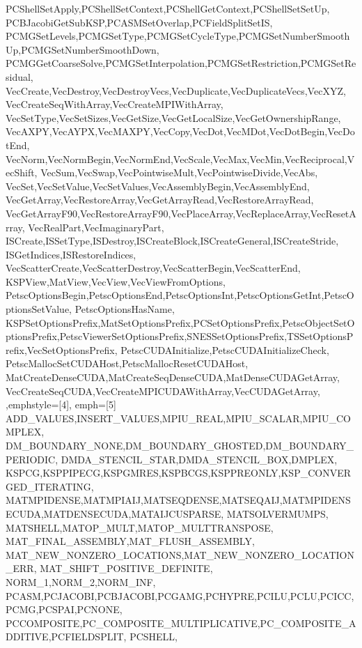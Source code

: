 {{{{{    PCShellSetApply,PCShellSetContext,PCShellGetContext,PCShellSetSetUp,
    PCBJacobiGetSubKSP,PCASMSetOverlap,PCFieldSplitSetIS,
    PCMGSetLevels,PCMGSetType,PCMGSetCycleType,PCMGSetNumberSmoothUp,PCMGSetNumberSmoothDown,
    PCMGGetCoarseSolve,PCMGSetInterpolation,PCMGSetRestriction,PCMGSetResidual,
    VecCreate,VecDestroy,VecDestroyVecs,VecDuplicate,VecDuplicateVecs,VecXYZ,
    VecCreateSeqWithArray,VecCreateMPIWithArray,
    VecSetType,VecSetSizes,VecGetSize,VecGetLocalSize,VecGetOwnershipRange,
    VecAXPY,VecAYPX,VecMAXPY,VecCopy,VecDot,VecMDot,VecDotBegin,VecDotEnd,
    VecNorm,VecNormBegin,VecNormEnd,VecScale,VecMax,VecMin,VecReciprocal,VecShift,
    VecSum,VecSwap,VecPointwiseMult,VecPointwiseDivide,VecAbs,
    VecSet,VecSetValue,VecSetValues,VecAssemblyBegin,VecAssemblyEnd,
    VecGetArray,VecRestoreArray,VecGetArrayRead,VecRestoreArrayRead,
    VecGetArrayF90,VecRestoreArrayF90,VecPlaceArray,VecReplaceArray,VecResetArray,
    VecRealPart,VecImaginaryPart,
    ISCreate,ISSetType,ISDestroy,ISCreateBlock,ISCreateGeneral,ISCreateStride,
    ISGetIndices,ISRestoreIndices,
    VecScatterCreate,VecScatterDestroy,VecScatterBegin,VecScatterEnd,
    KSPView,MatView,VecView,VecViewFromOptions,
    PetscOptionsBegin,PetscOptionsEnd,PetscOptionsInt,PetscOptionsGetInt,PetscOptionsSetValue,
    PetscOptionsHasName,
    KSPSetOptionsPrefix,MatSetOptionsPrefix,PCSetOptionsPrefix,PetscObjectSetOptionsPrefix,PetscViewerSetOptionsPrefix,SNESSetOptionsPrefix,TSSetOptionsPrefix,VecSetOptionsPrefix,
    PetscCUDAInitialize,PetscCUDAInitializeCheck,
    PetscMallocSetCUDAHost,PetscMallocResetCUDAHost,
    MatCreateDenseCUDA,MatCreateSeqDenseCUDA,MatDenseCUDAGetArray,
    VecCreateSeqCUDA,VecCreateMPICUDAWithArray,VecCUDAGetArray,
  },emphstyle={[4]\color{red!70!black}\bfseries},
  emph={[5] %
    ADD_VALUES,INSERT_VALUES,MPIU_REAL,MPIU_SCALAR,MPIU_COMPLEX,
    DM_BOUNDARY_NONE,DM_BOUNDARY_GHOSTED,DM_BOUNDARY_PERIODIC,
    DMDA_STENCIL_STAR,DMDA_STENCIL_BOX,DMPLEX,
    KSPCG,KSPPIPECG,KSPGMRES,KSPBCGS,KSPPREONLY,KSP_CONVERGED_ITERATING,
    MATMPIDENSE,MATMPIAIJ,MATSEQDENSE,MATSEQAIJ,MATMPIDENSECUDA,MATDENSECUDA,MATAIJCUSPARSE,
    MATSOLVERMUMPS,
    MATSHELL,MATOP_MULT,MATOP_MULTTRANSPOSE,
    MAT_FINAL_ASSEMBLY,MAT_FLUSH_ASSEMBLY,
    MAT_NEW_NONZERO_LOCATIONS,MAT_NEW_NONZERO_LOCATION_ERR,
    MAT_SHIFT_POSITIVE_DEFINITE,
    NORM_1,NORM_2,NORM_INF,
    PCASM,PCJACOBI,PCBJACOBI,PCGAMG,PCHYPRE,PCILU,PCLU,PCICC,PCMG,PCSPAI,PCNONE,
    PCCOMPOSITE,PC_COMPOSITE_MULTIPLICATIVE,PC_COMPOSITE_ADDITIVE,PCFIELDSPLIT,
    PCSHELL,
}}}}}
